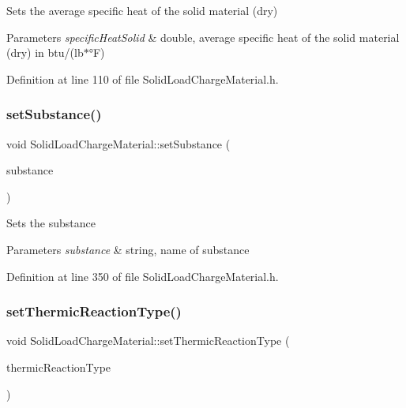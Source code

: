 Sets the average specific heat of the solid material (dry) 
\begin{DoxyParams}{Parameters}
{\em specific\+Heat\+Solid} & double, average specific heat of the solid material (dry) in btu/(lb$\ast$°F) \\
\hline
\end{DoxyParams}


Definition at line 110 of file Solid\+Load\+Charge\+Material.\+h.

\mbox{\label{class_solid_load_charge_material_aebe376ab016f48678c3a70390b4ea52a}} 
\subsubsection{\texorpdfstring{set\+Substance()}{setSubstance()}}
{\footnotesize\ttfamily void Solid\+Load\+Charge\+Material\+::set\+Substance (\begin{DoxyParamCaption}\item[{std\+::string const \&}]{substance }\end{DoxyParamCaption})\hspace{0.3cm}{\ttfamily [inline]}}

Sets the substance 
\begin{DoxyParams}{Parameters}
{\em substance} & string, name of substance \\
\hline
\end{DoxyParams}


Definition at line 350 of file Solid\+Load\+Charge\+Material.\+h.

\mbox{\label{class_solid_load_charge_material_ae2f85e0fbeff9f72b808bf86e645797f}} 
\subsubsection{\texorpdfstring{set\+Thermic\+Reaction\+Type()}{setThermicReactionType()}}
{\footnotesize\ttfamily void Solid\+Load\+Charge\+Material\+::set\+Thermic\+Reaction\+Type (\begin{DoxyParamCaption}\item[{\hyperlink{namespace_load_charge_material_a51d4263e865a5d86236622dd3fe23fd1}{Load\+Charge\+Material\+::\+Thermic\+Reaction\+Type}}]{thermic\+Reaction\+Type }\end{DoxyParamCaption})\hspace{0.3cm}{\ttfamily [inline]}}

